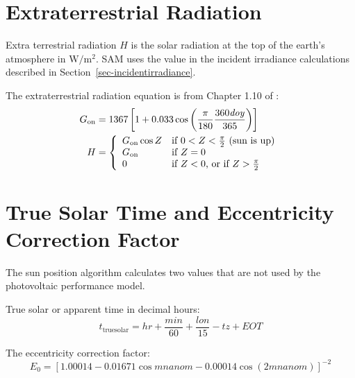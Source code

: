 \documentclass[12pt,letterpaper]{article}
\begin{document}
\section{Extraterrestrial Radiation}\label{sec-hextra}

Extra terrestrial radiation $H$ is the solar radiation at the top of the earth's atmosphere in $\mathrm{W/m^2}$. SAM uses the value in the incident irradiance calculations described in Section~\ref{sec-incidentirradiance}.
 
The extraterrestrial radiation equation is from Chapter 1.10 of \citet{duffie2013}:
\begin{align}\label{eqn-hextra}
G_{\mathrm{on}} &= 1367 \left[1+0.033\cos\left( \frac{\pi}{180}\frac{360\mathit{doy}}{365} \right)\right]\notag\\
H &= \left\{
\begin{array}{ll}
G_{\mathrm{on}} \cos Z & \text{if $0 < Z < \frac{\pi}{2}$ (sun is up)}\\
G_{\mathrm{on}} & \text{if $Z=0$}\\
0 & \text{if $Z<0$, or if $Z>\frac{\pi}{2}$}
\end{array}
\right.
\end{align}

\section{True Solar Time and Eccentricity Correction Factor}

The sun position algorithm calculates two values that are not used by the photovoltaic performance model. 

True solar or apparent time in decimal hours:
\begin{equation}
t_{\mathrm{truesolar}} = \mathit{hr} + \frac{min}{60} + \frac{\mathit{lon}}{15} - \mathit{tz} + \mathit{EOT}
\end{equation}

The eccentricity correction factor:
\begin{equation}
E_0 = [ 1.00014 - 0.01671\cos\mathit{mnanom} - 0.00014\cos(2\mathit{mnanom}) ]^{-2}
\end{equation}

\end{document}
